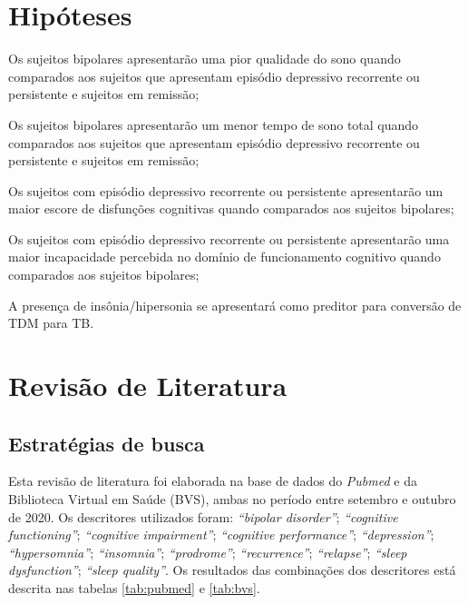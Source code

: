 \documentclass[chapter=TITLE,
               oneside,
               12pt,
               a4paper,
               english,
               brazil]{abntex2}    %
\begin{document}
\vspace{\onelineskip}
\chapter{Hipóteses}\label{sec:hipoteses}

    \begin{alineas}

        \item Os sujeitos bipolares apresentarão uma pior qualidade do sono
        quando comparados aos sujeitos que apresentam episódio depressivo
        recorrente ou persistente e sujeitos em remissão;

        \item Os sujeitos bipolares apresentarão um menor tempo de sono total
        quando comparados aos sujeitos que apresentam episódio depressivo
        recorrente ou persistente e sujeitos em remissão;

        \item Os sujeitos com episódio depressivo recorrente ou persistente
        apresentarão um maior escore de disfunções cognitivas quando comparados
        aos sujeitos bipolares;

        \item Os sujeitos com episódio depressivo recorrente ou persistente
        apresentarão uma maior incapacidade percebida no domínio de
        funcionamento cognitivo quando comparados aos sujeitos bipolares;

        \item A presença de insônia/hipersonia se apresentará como preditor
        para conversão de TDM para TB.

    \end{alineas}

\vspace{\onelineskip}
\chapter{Revisão de Literatura}\label{sec:revisao}

    \section{Estratégias de busca}\label{sec:estrategias}

        Esta revisão de literatura foi elaborada na base de dados do \textit{Pubmed}
        e da Biblioteca Virtual em Saúde (BVS), ambas no período entre setembro e
        outubro de 2020.
        Os descritores utilizados foram: \textit{``bipolar disorder''};
        \textit{``cognitive functioning''}; \textit{``cognitive impairment''};
        \textit{``cognitive performance''}; \textit{``depression''};
        \textit{``hypersomnia''}; \textit{``insomnia''}; \textit{``prodrome''};
        \textit{``recurrence''}; \textit{``relapse''}; \textit{``sleep dysfunction''};
        \textit{``sleep quality''}.
        Os resultados das combinações dos descritores está descrita nas tabelas
        \ref{tab:pubmed} e \ref{tab:bvs}.
    
\end{document}

